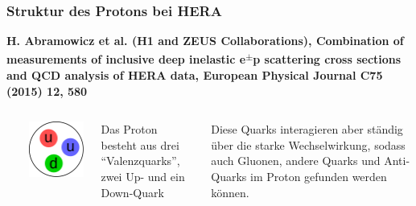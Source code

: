 \documentclass[10pt,t]{beamer}
\begin{document}
\begin{frame}
\frametitle{Struktur des Protons bei HERA}
\vspace*{-2.6\baselineskip}
\alert{\bfseries\footnotesize H. Abramowicz et al. (H1 and ZEUS Collaborations), Combination of measurements of inclusive deep inelastic e\textsuperscript{$\pm$}p scattering cross sections and QCD analysis of HERA data, European Physical Journal C75 (2015) 12, 580}
\vspace*{\baselineskip}
\begin{columns}
~\\[-\baselineskip]
\begin{minipage}[c]{0.3\textwidth}
    \includegraphics[width=\textwidth]{hera-proton1}
\end{minipage}
\hfill
\begin{minipage}[c]{0.65\textwidth}\raggedright
    Das Proton besteht aus drei ``Valenzquarks'', zwei Up- und ein Down-Quark
\end{minipage}\vspace*{1ex}

Diese Quarks interagieren aber ständig über die starke Wechselwirkung, sodass auch Gluonen, andere Quarks und Anti-Quarks im Proton gefunden werden können.  


\end{columns}
\end{frame}
\end{document}
